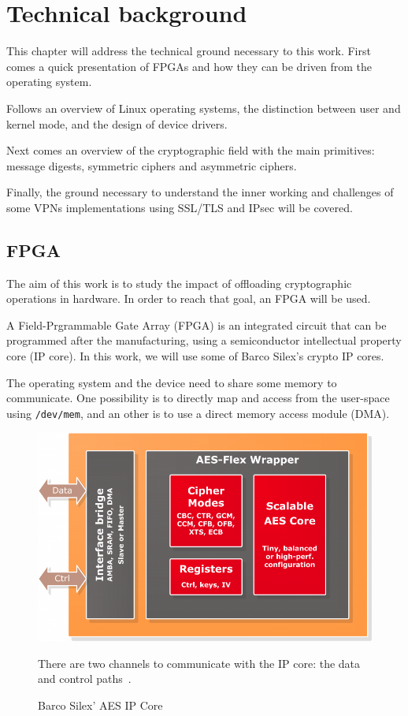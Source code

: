 \chapter{Technical background}\label{chap:theory}

This chapter will address the technical ground necessary to this work.
First comes a quick presentation of FPGAs and how they can be driven from the operating system.

\noindent Follows an overview of Linux operating systems, the distinction between user and kernel mode, and the design of device drivers.

\noindent Next comes an overview of the cryptographic field with the main primitives: message digests, symmetric ciphers and asymmetric ciphers.

\noindent Finally, the ground necessary to understand the inner working and challenges of some VPNs implementations using SSL/TLS and IPsec will be covered.



\section{FPGA}
The aim of this work is to study the impact of offloading cryptographic operations in hardware.
In order to reach that goal, an FPGA will be used.

A Field-Prgrammable Gate Array (FPGA) is an integrated circuit that can be programmed after the manufacturing, using a semiconductor intellectual property core (IP core).
In this work, we will use some of Barco Silex's crypto IP cores.

The operating system and the device need to share some memory to communicate.
One possibility is to directly map and access from the user-space using \texttt{/dev/mem}, and an other is to use a direct memory access module (DMA).

\begin{figure}
\includegraphics[width=\linewidth]{barco-ba411e-ipcore}
\caption{Barco Silex' AES IP Core}{There are two channels to communicate with the IP core: the data and control paths~\cite{barco-ba411e}.}
\label{fig:barco-ba411e-ipcore}
\end{figure}

